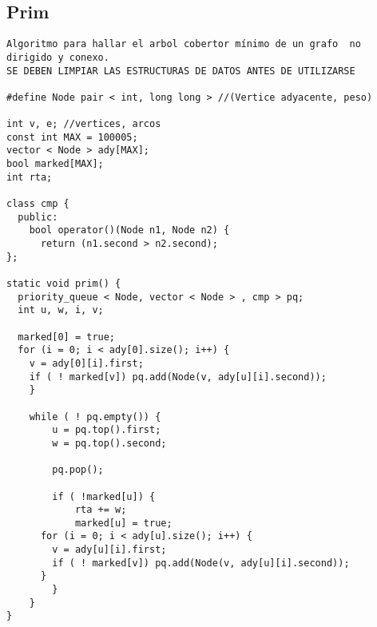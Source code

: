 \documentclass[10pt,letterpaper,twocolumn,twosided]{article}
\begin{document}
\subsection{Prim}
\begin{lstlisting}
Algoritmo para hallar el arbol cobertor mínimo de un grafo  no dirigido y conexo. 
SE DEBEN LIMPIAR LAS ESTRUCTURAS DE DATOS ANTES DE UTILIZARSE

#define Node pair < int, long long > //(Vertice adyacente, peso)

int v, e; //vertices, arcos
const int MAX = 100005; 
vector < Node > ady[MAX]; 
bool marked[MAX]; 
int rta; 

class cmp {
  public:
    bool operator()(Node n1, Node n2) {
      return (n1.second > n2.second); 
}; 

static void prim() {
  priority_queue < Node, vector < Node > , cmp > pq; 
  int u, w, i, v; 

  marked[0] = true; 
  for (i = 0; i < ady[0].size(); i++) {
    v = ady[0][i].first; 
    if ( ! marked[v]) pq.add(Node(v, ady[u][i].second)); 
	}

	while ( ! pq.empty()) {
		u = pq.top().first; 
		w = pq.top().second; 

		pq.pop(); 

		if ( !marked[u]) {
			rta += w; 
			marked[u] = true; 
      for (i = 0; i < ady[u].size(); i++) {
        v = ady[u][i].first; 
        if ( ! marked[v]) pq.add(Node(v, ady[u][i].second)); 
      }
		}
	}
}\end{lstlisting}
\end{document}

